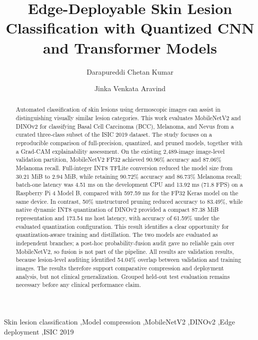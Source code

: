 \documentclass[3p,times,procedia]{elsarticle}
\begin{document}
\begin{frontmatter}


\title{Edge-Deployable Skin Lesion Classification with Quantized CNN and Transformer Models}

\author[a]{Darapureddi Chetan Kumar}
\author[a]{Jinka Venkata Aravind}

\address[a]{Department of Computer Science and Engineering, Amrita School of Computing, Amrita Vishwa Vidyapeetham,Chennai,601103,India}

\begin{abstract}
Automated classification of skin lesions using dermoscopic images can assist in distinguishing visually similar lesion categories. This work evaluates MobileNetV2 and DINOv2 for classifying Basal Cell Carcinoma (BCC), Melanoma, and Nevus from a curated three-class subset of the ISIC 2019 dataset. The study focuses on a reproducible comparison of full-precision, quantized, and pruned models, together with a Grad-CAM explainability assessment. On the existing 2,489-image image-level validation partition, MobileNetV2 FP32 achieved 90.96\% accuracy and 87.06\% Melanoma recall. Full-integer INT8 TFLite conversion reduced the model size from 30.21 MiB to 2.94 MiB, while retaining 90.72\% accuracy and 86.73\% Melanoma recall; batch-one latency was 4.51 ms on the development CPU and 13.92 ms (71.8 FPS) on a Raspberry Pi 4 Model B, compared with 597.59 ms for the FP32 Keras model on the same device. In contrast, 50\% unstructured pruning reduced accuracy to 83.49\%, while native dynamic INT8 quantization of DINOv2 provided a compact 87.38 MiB representation and 173.54 ms host latency, with accuracy of 61.59\% under the evaluated quantization configuration. This result identifies a clear opportunity for quantization-aware training and distillation. The two models are evaluated as independent branches; a post-hoc probability-fusion audit gave no reliable gain over MobileNetV2, so fusion is not part of the pipeline. All results are validation results, because lesion-level auditing identified 54.04\% overlap between validation and training images. The results therefore support comparative compression and deployment analysis, but not clinical generalization. Grouped held-out test evaluation remains necessary before any clinical performance claim.
\end{abstract}

\begin{keyword}
Skin lesion classification \sep Model compression \sep MobileNetV2 \sep DINOv2 \sep Edge deployment \sep ISIC 2019
\end{keyword}


\end{frontmatter}
\end{document}
